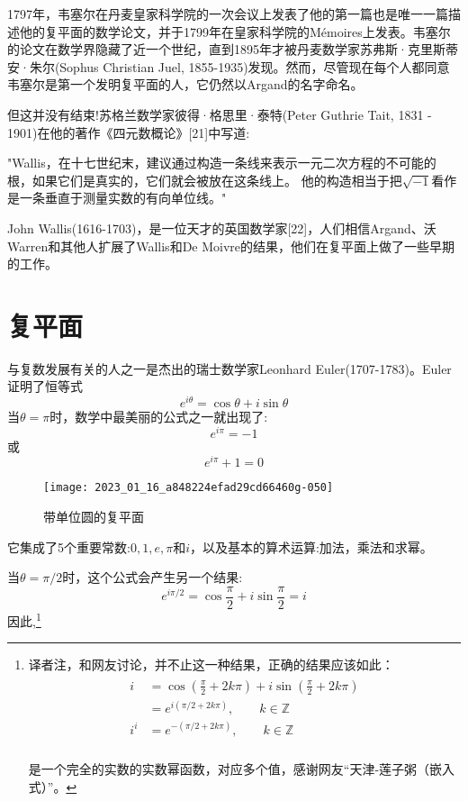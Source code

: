 1797年，韦塞尔在丹麦皇家科学院的一次会议上发表了他的第一篇也是唯一一篇描述他的复平面的数学论文，并于1799年在皇家科学院的Mémoires上发表。韦塞尔的论文在数学界隐藏了近一个世纪，直到1895年才被丹麦数学家苏弗斯·克里斯蒂安·朱尔(Sophus Christian Juel, 1855-1935)发现。然而，尽管现在每个人都同意韦塞尔是第一个发明复平面的人，它仍然以Argand的名字命名。

但这并没有结束!苏格兰数学家彼得·格思里·泰特(Peter Guthrie Tait, 1831 - 1901)在他的著作《四元数概论》[21]中写道:

\begin{CJK}{UTF8}{gkai}
    "Wallis，在十七世纪末，建议通过构造一条线来表示一元二次方程的不可能的根，如果它们是真实的，它们就会被放在这条线上。
    他的构造相当于把$\sqrt{-1}$看作是一条垂直于测量实数的有向单位线。"
\end{CJK}

John Wallis(1616-1703)，是一位天才的英国数学家[22]，人们相信Argand、沃Warren和其他人扩展了Wallis和De Moivre的结果，他们在复平面上做了一些早期的工作。

\section{复平面}
与复数发展有关的人之一是杰出的瑞士数学家Leonhard Euler(1707-1783)。Euler证明了恒等式
$$
e^{i \theta}=\cos \theta+i \sin \theta
$$
当$\theta=\pi$时，数学中最美丽的公式之一就出现了:
$$
e^{i \pi}=-1
$$
或
$$
e^{i \pi}+1=0
$$

\begin{figure}[h!]
    \centering
    \texttt{[image: 2023\_01\_16\_a848224efad29cd66460g-050]}
    \caption{带单位圆的复平面}
\end{figure}
它集成了5个重要常数:$0,1,e, \pi$和$i$，以及基本的算术运算:加法，乘法和求幂。

当$\theta=\pi / 2$时，这个公式会产生另一个结果:
$$
e^{i \pi / 2}=\cos \frac{\pi}{2}+i \sin \frac{\pi}{2}=i
$$
因此,\footnote{译者注，和网友讨论，并不止这一种结果，正确的结果应该如此：
\begin{align*}
    \begin{aligned}
        i &=  \cos (\frac{\pi}{2}+2k\pi)+i\sin(\frac{\pi}{2}+2k\pi)\\
        &=e^{i({\pi/2}+2k\pi)},\qquad k\in \mathbb{Z}\\
        i^i &= e^{-(\pi/2+2k\pi)},\qquad k\in \mathbb{Z}\\
    \end{aligned}
\end{align*}

是一个完全的实数的实数幂函数，对应多个值，感谢网友“天津-莲子粥（嵌入式）”。}

